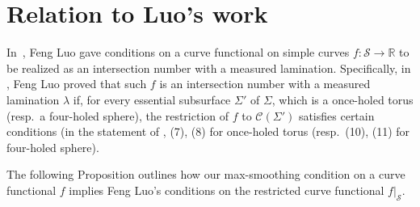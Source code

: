 \section{Relation to Luo's work}
\label{sec:luo}
In~\cite{Lu10}, Feng Luo gave conditions on a curve functional on simple curves $f \colon \mathcal{S} \to \mathbb{R}$ to be realized as an intersection number with a measured lamination.
Specifically, in \cite[Theorem~5.1]{Lu10}, Feng Luo proved that such
$f$ is an intersection number with a measured lamination $\lambda$ if, for every essential subsurface $\Sigma'$ of $\Sigma$, which is a once-holed torus (resp.\ a four-holed sphere), the restriction of $f$ to $\mathcal{C}(\Sigma')$ satisfies certain conditions (in the statement of \cite[Theorem~5.1]{Lu10}, (7), (8) for once-holed torus (resp.\ (10), (11) for four-holed sphere).

The following Proposition outlines how our max-smoothing condition on a curve functional $f$ implies Feng Luo's conditions on the restricted curve functional $f|_{\mathcal{S}}$.

